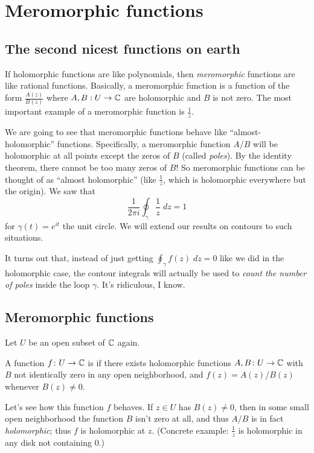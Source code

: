 \chapter{Meromorphic functions}
\section{The second nicest functions on earth}
If holomorphic functions are like polynomials,
then \emph{meromorphic} functions are like rational functions.
Basically, a meromorphic function is a function of the form
$ \frac{A(z)}{B(z)} $
where $A , B:  U \to \mathbb C$ are holomorphic and $B$ is not zero.
The most important example of a meromorphic function is $\frac 1z$.

We are going to see that meromorphic functions behave
like ``almost-holomorphic'' functions.
Specifically, a meromorphic function $A/B$ will be holomorphic at all points
except the zeros of $B$ (called \emph{poles}).
By the identity theorem, there cannot be too many zeros of $B$!
So meromorphic functions can be thought of as ``almost holomorphic''
(like $\frac 1z$, which is holomorphic everywhere but the origin).
We saw that
\[ \frac{1}{2\pi i} \oint_{\gamma} \frac 1z \; dz =  1 \]
for $\gamma(t) = e^{it}$ the unit circle.
We will extend our results on contours to such situations.

It turns out that, instead of just getting $\oint_\gamma f(z) \; dz = 0$
like we did in the holomorphic case,
the contour integrals will actually be used to
\emph{count the number of poles} inside the loop $\gamma$.
It's ridiculous, I know.

\section{Meromorphic functions}

Let $U$ be an open subset of $\mathbb C$ again.
\begin{definition}
	A function $f \colon U \to \mathbb C$ is 
	if there exists holomorphic functions $A, B \colon U \to \mathbb C$
	with $B$ not identically zero in any open neighborhood,
	and $f(z) = A(z)/B(z)$ whenever $B(z) \neq 0$.
\end{definition}
Let's see how this function $f$ behaves.
If $z \in U$ has $B(z) \neq 0$,
then in some small open neighborhood the function $B$ isn't zero
at all, and thus $A/B$ is in fact \emph{holomorphic};
thus $f$ is holomorphic at $z$.
(Concrete example: $\frac 1z$ is holomorphic
in any disk not containing $0$.)


